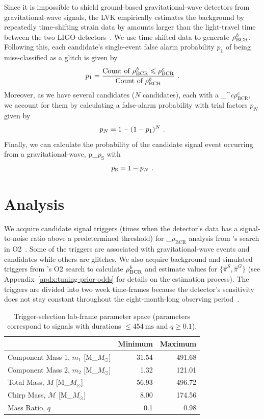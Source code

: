 \documentclass[useAMS,fleqn, usenatbib, final]{mnras}
\newcommand{\pycbc}{{\sc {{PyCBC}}}\xspace}
\newcommand{\fancytext}[1]{{\relax\ifmmode#1\else $#1$\fi}\xspace}
\newcommand{\mathcmd}[1]{{\sc \relax\ifmmode#1\else $#1$\fi}\xspace}
\newcommand{\bcr}{\mathcmd{\rho_\text{BCR}}}
\newcommand{\bgrdbcr}{\mathcmd{\rho_\text{BCR}^\textit{b}}}
\newcommand{\candbcr}{\mathcmd{\rho_\text{BCR}^\textit{c}}}
\newcommand{\msun}{\mathcmd{M_\odot}}
\newcommand{\fap}{\mathcmd{p_N}}
\newcommand{\pastrobcr}{\fancytext{p_\text{S}}}
\begin{document}
Since it is impossible to shield ground-based gravitational-wave detectors from gravitational-wave signals, the LVK empirically estimates the background by repeatedly time-shifting strain data by amounts larger than the light-travel time between the two LIGO detectors~\citep{GWTC1}. We use time-shifted data to generate $\bgrdbcr$. Following this, each candidate's single-event false alarm probability $p_1$ of being miss-classified as a glitch is given by
\begin{equation}
    p_1 = \frac{\text{Count of } \bgrdbcr \leq \candbcr}{\text{Count of } \bgrdbcr} \ .
\end{equation}
Moreover, as we have several candidates ($N$ candidates), each with a \candbcr, we account for them by calculating a false-alarm probability with trial factors $p_N$ given by
\begin{equation}
    \fap = 1 - (1-p_1)^N \ .
\end{equation}
Finally, we can calculate the probability of the candidate signal event occurring from  a gravitational-wave, \pastrobcr with 
\begin{equation}
\pastrobcr = 1 - \fap \ . 
\end{equation}


\section{Analysis}
\label{sec:Analysis}

We acquire candidate signal triggers (times when the detector's data has a signal-to-noise ratio above a predetermined threshold) for \bcr analysis from \pycbc's search in O2~\citep{pycbc_code, pycbc_og0, pycbc_og1, pycbc_og2, pycbc_og3, pycbc_og4, pycbc_og5, pycbc_og6, public_ligo_o2_triggers}.  Some of the triggers are associated with gravitational-wave events and candidates while others are glitches. We also acquire background and simulated triggers from \pycbc's O2 search to calculate $\bgrdbcr$ and estimate values for $\{\hat{\pi}^S,\hat{\pi}^G\}$ (see Appendix~\ref{apdx:tuning-prior-odds} for details on the estimation process). The triggers are divided into two week time-frames because the detector's sensitivity does not stay constant throughout the eight-month-long observing period~\citep{pycbc_og4}.

\begin{table}
\caption[BBH parameters correspond to duration $\leq454\ \text{ms}$]{\label{tab:parameters}Trigger-selection lab-frame parameter space (parameters correspond to signals with durations $\leq454 \ \text{ms}$ and $q\geq0.1$).}
\centering
\begin{tabular}{lrr}
\toprule
           & Minimum & Maximum\\
\midrule
Component Mass 1, $m_1$ [\msun] & 31.54 & 491.68\\
Component Mass 2, $m_2$ [\msun] & 1.32 & 121.01\\
Total Mass, $M$ [\msun] & 56.93 & 496.72\\
Chirp Mass, $\mathcal{M}$ [\msun] & 8.00 & 174.56\\
Mass Ratio, $q$ & 0.1 & 0.98\\
\end{tabular}
\end{table}
\end{document}
